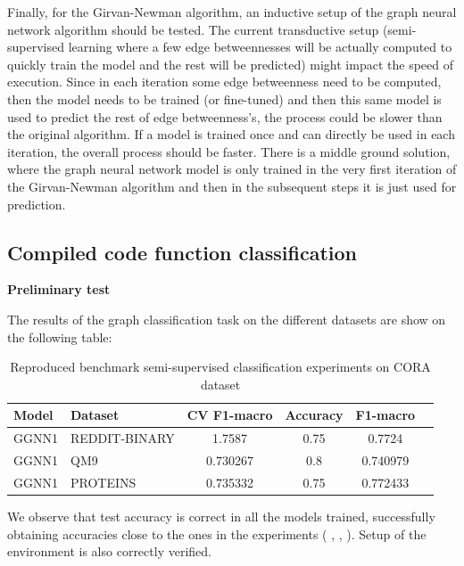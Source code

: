 Finally, for the Girvan-Newman algorithm, an inductive setup of the graph neural network algorithm should be tested.  The current transductive setup (semi-supervised learning where a few edge betweennesses will be actually computed to quickly train the model and the rest will be predicted) might impact the speed of execution. Since in each iteration some edge betweenness need to be computed, then the model needs to be trained (or fine-tuned) and then this same model is used to predict the rest of edge betweenness's, the process could be slower than the original algorithm. If a model is trained once and can directly be used in each iteration, the overall process should be faster. There is a middle ground solution, where the graph neural network model is only trained in the very first iteration of the Girvan-Newman algorithm and then in the subsequent steps it is just used for prediction. 



\newpage
\subsection{Compiled code function classification}


\textbf{Preliminary test}

The results of the graph classification task on the different datasets are show on the following table:


\begin{table}[H]
\centering
\begin{tabular}{|llccc|c}
\hline
    Model &         Dataset &   CV F1-macro &   Accuracy &  F1-macro \\
\hline
  GGNN1 &   REDDIT-BINARY   &     1.7587    &   0.75 &     0.7724 \\
  GGNN1 &   QM9             &     0.730267  &   0.8 &      0.740979 \\
  GGNN1 &   PROTEINS        &     0.735332    &   0.75 &   0.772433 \\
\hline
\end{tabular}
\label{preliminar_GN}\caption{Reproduced benchmark semi-supervised classification experiments on CORA dataset }
\end{table}

We observe that test accuracy is correct in all the models trained, successfully obtaining accuracies close to the ones in the experiments ( \cite{fey2019fast}, \cite{borgwardt2005protein}, \cite{dobson2003distinguishing}). Setup of the environment is also correctly verified. \\
\\




